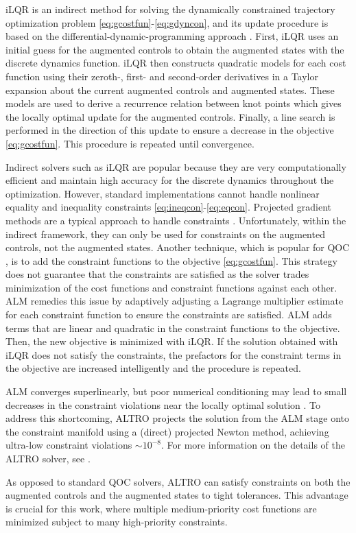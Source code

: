 iLQR is an indirect method
for solving the dynamically constrained
trajectory optimization problem \eqref{eq:gcostfun}-\eqref{eq:gdyncon},
and its update procedure is based on the differential-dynamic-programming approach
\cite{mayne1966a}.
First, iLQR uses an initial guess for the augmented controls to obtain the augmented
states with the discrete dynamics function.
iLQR then constructs quadratic models for each cost function using
their zeroth-, first- and second-order derivatives in a Taylor expansion
about the current augmented controls and augmented states.
These models are used to derive a recurrence relation between knot points
which gives the locally optimal update for the augmented controls.
Finally, a line search \cite{zhang2006global}
is performed in the direction of this update to ensure a
decrease in the objective \eqref{eq:gcostfun}. This procedure
is repeated until convergence.

Indirect solvers such as iLQR are popular
because they are very computationally efficient and maintain
high accuracy for the discrete dynamics throughout the optimization.
However, standard implementations cannot handle
nonlinear equality and inequality
constraints \eqref{eq:ineqcon}-\eqref{eq:eqcon}.
Projected gradient methods are a typical approach
to handle constraints
\cite{clarkson2010coresets, hauswirth2016projected, morzhin2019minimal,
  nikolskii2007convergence}. Unfortunately, within the indirect framework,
they can only be used for constraints on the augmented controls,
not the augmented states.
Another technique, which is popular for QOC \cite{heeres2017implementing, leung2017speedup,
reinhold2019controlling},
is to add the constraint functions to the objective
\eqref{eq:gcostfun}. 
This strategy does not guarantee that the constraints
are satisfied as the solver trades
minimization of the cost functions and constraint functions against each other.
ALM remedies this issue by adaptively adjusting a Lagrange multiplier estimate
for each constraint function to ensure the constraints are satisfied.
ALM adds terms that are linear and quadratic in the constraint functions
to the objective. Then, the new objective is minimized with
iLQR. If the solution obtained with iLQR does not satisfy the constraints,
the prefactors for the constraint terms in the objective are increased
intelligently and the procedure is repeated.

ALM converges superlinearly, but poor numerical conditioning may lead
to small decreases in the constraint violations near the locally optimal solution
\cite{bertsekas1996constrained}.
To address this shortcoming, ALTRO
projects the solution from the ALM stage onto the constraint manifold using
a (direct) projected Newton method, achieving ultra-low
constraint violations $\sim 10^{-8}$.
For more information on the details of the ALTRO
solver, see \cite{howell2019altro, Jackson2020altroc}.

As opposed to standard QOC solvers, ALTRO
can satisfy constraints
on both the augmented controls and the augmented states to tight tolerances.
This advantage is crucial for this work, where multiple medium-priority cost functions
are minimized subject to many high-priority constraints.
